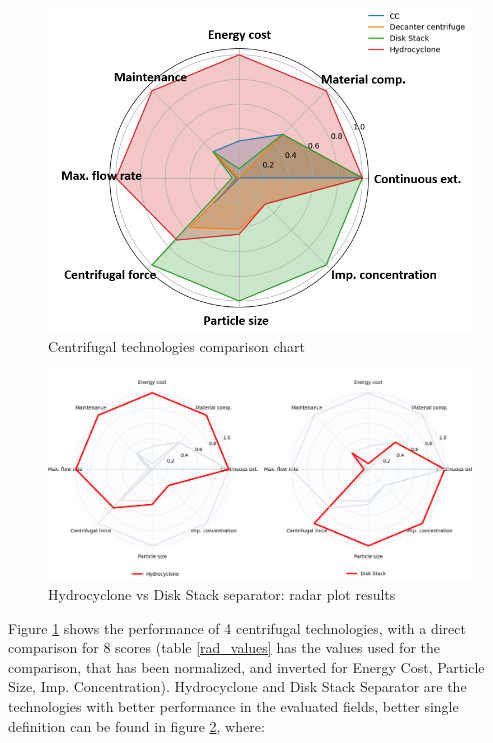 \begin{figure}[H]
	\centering
	\includegraphics[width=0.85\linewidth]{rad_chart.png}
	\captionsetup{font=bf, size=small}
	\caption{Centrifugal technologies comparison chart}
	\label{rad_chart}
\end{figure}
\begin{figure}[H]
	\centering
	\includegraphics[width=1\linewidth]{rad_chart_comp.png}
	\captionsetup{font=bf, size=small}
	\caption{Hydrocyclone vs Disk Stack separator: radar plot results}
	\label{rad_chart_comp}
\end{figure}

\noindent Figure \ref{rad_chart} shows the performance of 4 centrifugal technologies, with a direct comparison for 8 scores (table \ref{rad_values} has the values used for the comparison, that has been normalized, and inverted for Energy Cost, Particle Size, Imp. Concentration). Hydrocyclone and Disk Stack Separator are the technologies with better performance in the evaluated fields, better single definition can be found in figure \ref{rad_chart_comp}, where:


